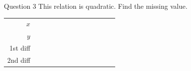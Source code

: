 \documentclass[11pt]{article}
\begin{document}
\begin{qbox}{Question 3}
This relation is quadratic. Find the missing value.
\begin{center}\renewcommand{\arraystretch}{1.15}\setlength{\tabcolsep}{2pt}\begin{tabular}{r|>{\centering\arraybackslash}p{0.62cm}>{\centering\arraybackslash}p{0.62cm}>{\centering\arraybackslash}p{0.62cm}>{\centering\arraybackslash}p{0.62cm}>{\centering\arraybackslash}p{0.62cm}>{\centering\arraybackslash}p{0.62cm}>{\centering\arraybackslash}p{0.62cm}>{\centering\arraybackslash}p{0.62cm}>{\centering\arraybackslash}p{0.62cm}>{\centering\arraybackslash}p{0.62cm}>{\centering\arraybackslash}p{0.62cm}>{\centering\arraybackslash}p{0.62cm}}
$x$ & \multicolumn{2}{c}{\colorbox{iagreen}{\makebox[1.12cm]{\strut \color{white}\bfseries $0$}}} & \multicolumn{2}{c}{\colorbox{iagreen}{\makebox[1.12cm]{\strut \color{white}\bfseries $1$}}} & \multicolumn{2}{c}{\colorbox{iagreen}{\makebox[1.12cm]{\strut \color{white}\bfseries $2$}}} & \multicolumn{2}{c}{\colorbox{iagreen}{\makebox[1.12cm]{\strut \color{white}\bfseries $3$}}} & \multicolumn{2}{c}{\colorbox{iagreen}{\makebox[1.12cm]{\strut \color{white}\bfseries $4$}}} & \multicolumn{2}{c}{\colorbox{iagreen}{\makebox[1.12cm]{\strut \color{white}\bfseries $5$}}} \\[2pt]
$y$ & \multicolumn{2}{c}{\colorbox{keybg}{\makebox[1.12cm]{\strut $4$}}} & \multicolumn{2}{c}{\colorbox{keybg}{\makebox[1.12cm]{\strut $2$}}} & \multicolumn{2}{c}{\colorbox{keybg}{\makebox[1.12cm]{\strut $2$}}} & \multicolumn{2}{c}{\fbox{\makebox[0.94cm]{\strut}}} & \multicolumn{2}{c}{\colorbox{keybg}{\makebox[1.12cm]{\strut $8$}}} & \multicolumn{2}{c}{\colorbox{keybg}{\makebox[1.12cm]{\strut $14$}}} \\[2pt]
\textcolor{exblue}{\scriptsize 1st diff} & & \multicolumn{2}{c}{\colorbox{exbg}{\makebox[1.12cm]{\strut \textcolor{exblue}{$-2$}}}} & \multicolumn{2}{c}{\colorbox{exbg}{\makebox[1.12cm]{\strut \textcolor{exblue}{$+0$}}}} & \multicolumn{2}{c}{\colorbox{exbg}{\makebox[1.12cm]{\strut \textcolor{exblue}{$+2$}}}} & \multicolumn{2}{c}{\colorbox{exbg}{\makebox[1.12cm]{\strut \textcolor{exblue}{$+4$}}}} & \multicolumn{2}{c}{\colorbox{exbg}{\makebox[1.12cm]{\strut \textcolor{exblue}{$+6$}}}} & \\[2pt]
\textcolor{qorange}{\scriptsize 2nd diff} & & & \multicolumn{2}{c}{\colorbox{qbg}{\makebox[1.12cm]{\strut \textcolor{qorange!70!black}{$+2$}}}} & \multicolumn{2}{c}{\colorbox{qbg}{\makebox[1.12cm]{\strut \textcolor{qorange!70!black}{$+2$}}}} & \multicolumn{2}{c}{\colorbox{qbg}{\makebox[1.12cm]{\strut \textcolor{qorange!70!black}{$+2$}}}} & \multicolumn{2}{c}{\colorbox{qbg}{\makebox[1.12cm]{\strut \textcolor{qorange!70!black}{$+2$}}}} & & \\
\end{tabular}\end{center}\workspace{2.2cm}
\end{qbox}
\end{document}
